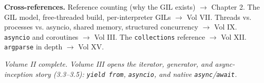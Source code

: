 \textbf{Cross-references.} Reference counting (why the GIL exists) $\rightarrow$ Chapter 2. The GIL
model, free-threaded build, per-interpreter GILs $\rightarrow$ Vol VII. Threads vs. processes vs.
asyncio, shared memory, structured concurrency $\rightarrow$ Vol IX. \texttt{asyncio} and
coroutines $\rightarrow$ Vol III. The \texttt{collections} reference $\rightarrow$ Vol XII.
\texttt{argparse} in depth $\rightarrow$ Vol XV.

\bigskip
\noindent\emph{Volume II complete. Volume III opens the iterator, generator, and async-inception
story (3.3--3.5): \texttt{yield from}, \texttt{asyncio}, and native \texttt{async}/\texttt{await}.}
